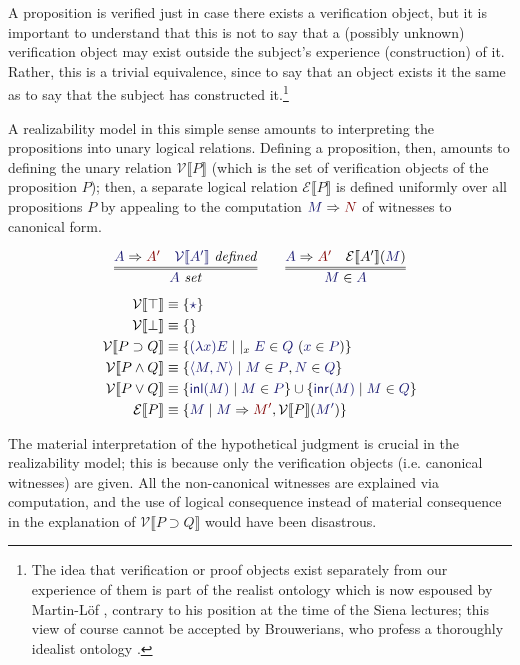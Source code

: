 \documentclass[11pt]{amsart}
\theoremstyle{definition}
\theoremstyle{remark}
\numberwithin{equation}{section}
\def\InputModeColorName{MidnightBlue}
\def\OutputModeColorName{Maroon}
\newcommand\InputMode[1]{{\color{\InputModeColorName}{#1}}}
\newcommand\OutputMode[1]{{\color{\OutputModeColorName}{#1}}}
\newcommand\HypJ[2]{#1\ (#2)}
\newcommand\GenJ[2]{\vert_{#1}\; #2}
\newcommand\IsSet[1]{\InputMode{#1}\ \mathit{set}}
\newcommand\Member[2]{\InputMode{#1}\in \InputMode{#2}}
\newcommand\Eval[2]{\InputMode{#1}\Rightarrow \OutputMode{#2}}
\newcommand\IsDefined[1]{\InputMode{#1}\ \mathit{defined}}
\newcommand\SEM[1]{\llbracket#1 \rrbracket}
\newcommand\VAL[1]{\mathcal{V}\SEM{#1}}
\newcommand\EXP[1]{\mathcal{E}\SEM{#1}}
\newcommand\True{\top}
\newcommand\False{\bot}
\newcommand\Imp[2]{#1\supset #2}
\newcommand\Conj[2]{#1\land #2}
\newcommand\Disj[2]{#1\lor #2}
\newcommand\It{\star}
\newcommand\Lam[2]{(\lambda #1) #2}
\newcommand\Pair[2]{\langle #1, #2 \rangle}
\newcommand\Inl[1]{\mathsf{inl}(#1)}
\newcommand\Inr[1]{\mathsf{inr}(#1)}
\begin{document}
A proposition is verified just in case there exists a verification object, but
it is important to understand that this is not to say that a (possibly unknown)
verification object may exist outside the subject's experience (construction) of
it. Rather, this is a trivial equivalence, since to say that an object exists it
the same as to say that the subject has constructed it.\footnote{The idea that
verification or proof objects exist separately from our experience of them is
part of the realist ontology which is now espoused by Martin-L\"of
\cite{prawitz:2012}, contrary to his position at the time of the Siena lectures;
this view of course cannot be accepted by Brouwerians, who profess a thoroughly
idealist ontology \cite{sundholm-mva, sundholm:2014}.}

A realizability model in this simple sense amounts to interpreting the
propositions into unary logical relations. Defining a proposition, then, amounts
to defining the unary relation $\VAL{P}$ (which is the set of verification
objects of the proposition $P$); then, a separate logical relation $\EXP{P}$ is
defined uniformly over all propositions $P$ by appealing to the computation
$\Eval{M}{N}$ of witnesses to canonical form.

\begin{gather*}
  \infer={
    \IsSet{A}
  }{
    \Eval{A}{A'} &
    \IsDefined{\VAL{A'}}
  } \qquad
  \infer={
    \Member{M}{A}
  }{
    \Eval{A}{A'} &
    \EXP{A'}(\InputMode{M})
  }
\end{gather*}
\begin{align*}
  \VAL{\True} &\equiv \{\InputMode{\It}\}\\
  \VAL{\False} &\equiv \{\}\\
  \VAL{\Imp{P}{Q}} &\equiv 
    \{ \InputMode{\Lam{x}{E}}
    \mid \GenJ{x}{\HypJ{\Member{E}{Q}}{\Member{x}{P}}}
    \}\\
  \VAL{\Conj{P}{Q}} &\equiv
    \{ \InputMode{\Pair{M}{N}}
    \mid \Member{M}{P}, \Member{N}{Q}
    \}\\
  \VAL{\Disj{P}{Q}} &\equiv
    \{ \InputMode{\Inl{M}}
    \mid \Member{M}{P}
    \} \cup
    \{ \InputMode{\Inr{M}}
    \mid \Member{M}{Q}
    \}\\
  \EXP{P} &\equiv
    \{ \InputMode{M}
    \mid \Eval{M}{M'}, \VAL{P}(\InputMode{M'})
    \}
\end{align*}

The material interpretation of the hypothetical judgment is crucial in the
realizability model; this is because only the verification objects (i.e.
canonical witnesses) are given. All the non-canonical witnesses are explained
via computation, and the use of logical consequence instead of material
consequence in the explanation of $\VAL{\Imp{P}{Q}}$ would have been disastrous.
\end{document}
